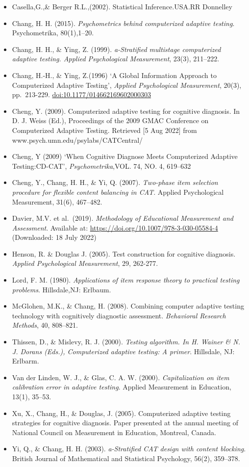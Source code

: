\documentclass[
]{article}
\begin{document}
\begin{itemize}
\item
  Casella,G.,\& Berger R.L.,(2002). Statistical Inference.USA.RR
  Donnelley
\item
  Chang, H. H. (2015).
  \textit{Psychometrics behind computerized adaptive testing}.
  Psychometrika, 80(1),1--20.
\item
  Chang, H. H., \& Ying, Z. (1999).
  \textit{a-Stratified multistage computerized adaptive testing. Applied
  Psychological Measurement}, 23(3), 211--222.
\item
  Chang, H.-H., \& Ying, Z.(1996) `A Global Information Approach to
  Computerized Adaptive Testing',
  \textit{Applied Psychological Measurement}, 20(3), pp.~213-229.
  \url{doi:10.1177/014662169602000303}
\item
  Cheng, Y. (2009). Computerized adaptive testing for cognitive
  diagnosis. In D. J. Weiss (Ed.), Proceedings of the 2009 GMAC
  Conference on Computerized Adaptive Testing. Retrieved {[}5 Aug
  2022{]} from www.psych.umn.edu/psylabs/CATCentral/
\item
  Cheng, Y (2009) `When Cognitive Diagnose Meets Computerized Adaptive
  Testing:CD-CAT', \emph{Psychometrika},VOL. 74, NO. 4, 619--632
\item
  Cheng, Y., Chang, H. H., \& Yi, Q. (2007).
  \textit{Two-phase item selection procedure for flexible content balancing in CAT}.
  Applied Psychological Measurement, 31(6), 467--482.
\item
  Davier, M.V. et al.~(2019).
  \textit{Methodology of Educational Measurement and Assessment}.
  Available at: \url{https://doi.org/10.1007/978-3-030-05584-4}
  (Downloaded: 18 July 2022)
\item
  Henson, R. \& Douglas J. (2005). Test construction for cognitive
  diagnosis. \emph{Applied Psychological Measurement}, 29, 262-277.
\item
  Lord, F. M. (1980).
  \textit{Applications of item response theory to practical testing problems}.
  Hillsdale,NJ: Erlbaum.
\item
  McGlohen, M.K., \& Chang, H. (2008). Combining computer adaptive
  testing technology with cognitively diagnostic assessment.
  \emph{Behavioral Research Methods}, 40, 808--821.
\item
  Thissen, D., \& Mislevy, R. J. (2000).
  \textit{Testing algorithm. In H. Wainer & N. J. Dorans (Eds.),
  Computerized adaptive testing: A primer}. Hillsdale, NJ: Erlbarm.
\item
  Van der Linden, W. J., \& Glas, C. A. W. (2000).
  \textit{Capitalization on item calibration error in adaptive testing}.
  Applied Measurement in Education, 13(1), 35--53.
\item
  Xu, X., Chang, H., \& Douglas, J. (2005). Computerized adaptive
  testing strategies for cognitive diagnosis. Paper presented at the
  annual meeting of National Council on Measurement in Education,
  Montreal, Canada.
\item
  Yi, Q., \& Chang, H. H. (2003).
  \textit{a-Stratified CAT design with content blocking}. British
  Journal of Mathematical and Statistical Psychology, 56(2), 359--378.
\end{itemize}
\end{document}
